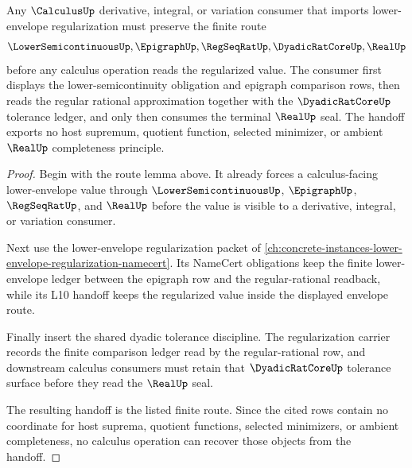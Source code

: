 \begin{theorem}
\label{thm:calculus-lower-envelope-regularization-handoff}
Any $\CalculusUp$ derivative, integral, or variation consumer that imports lower-envelope regularization must preserve the finite route
$$
\LowerSemicontinuousUp,\EpigraphUp,\RegSeqRatUp,\DyadicRatCoreUp,\RealUp
$$
before any calculus operation reads the regularized value. The consumer first displays the lower-semicontinuity obligation and epigraph comparison rows, then reads the regular rational approximation together with the $\DyadicRatCoreUp$ tolerance ledger, and only then consumes the terminal $\RealUp$ seal. The handoff exports no host supremum, quotient function, selected minimizer, or ambient $\RealUp$ completeness principle.
\end{theorem}
\begin{proof}
Begin with the route lemma above. It already forces a calculus-facing lower-envelope value through $\LowerSemicontinuousUp$, $\EpigraphUp$, $\RegSeqRatUp$, and $\RealUp$ before the value is visible to a derivative, integral, or variation consumer.

Next use the lower-envelope regularization packet of \autoref{ch:concrete-instances-lower-envelope-regularization-namecert}. Its NameCert obligations keep the finite lower-envelope ledger between the epigraph row and the regular-rational readback, while its L10 handoff keeps the regularized value inside the displayed envelope route.

Finally insert the shared dyadic tolerance discipline. The regularization carrier records the finite comparison ledger read by the regular-rational row, and downstream calculus consumers must retain that $\DyadicRatCoreUp$ tolerance surface before they read the $\RealUp$ seal.

The resulting handoff is the listed finite route. Since the cited rows contain no coordinate for host suprema, quotient functions, selected minimizers, or ambient completeness, no calculus operation can recover those objects from the handoff.
\end{proof}

